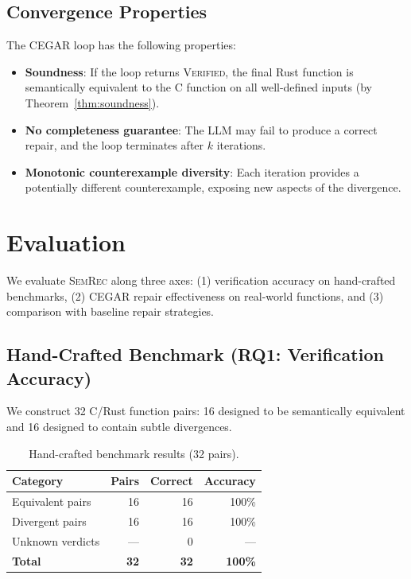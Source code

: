 \documentclass[10pt,letterpaper]{article}
\begin{document}
\subsection{Convergence Properties}

The CEGAR loop has the following properties:
\begin{itemize}[itemsep=1pt]
\item \textbf{Soundness}: If the loop returns \textsc{Verified}, the final
  Rust function is semantically equivalent to the C function on all well-defined
  inputs (by Theorem~\ref{thm:soundness}).
\item \textbf{No completeness guarantee}: The LLM may fail to produce a correct
  repair, and the loop terminates after $k$ iterations.
\item \textbf{Monotonic counterexample diversity}: Each iteration provides a
  potentially different counterexample, exposing new aspects of the divergence.
\end{itemize}

\section{Evaluation}
\label{sec:evaluation}

We evaluate \textsc{SemRec} along three axes: (1) verification accuracy on
hand-crafted benchmarks, (2) CEGAR repair effectiveness on real-world functions,
and (3) comparison with baseline repair strategies.

\subsection{Hand-Crafted Benchmark (RQ1: Verification Accuracy)}

We construct 32 C/Rust function pairs: 16 designed to be semantically equivalent
and 16 designed to contain subtle divergences.

\begin{table}[t]
\centering
\caption{Hand-crafted benchmark results (32 pairs).}
\label{tab:handcrafted}
\begin{tabular}{@{}lrrr@{}}
\toprule
\textbf{Category} & \textbf{Pairs} & \textbf{Correct} & \textbf{Accuracy} \\
\midrule
Equivalent pairs & 16 & 16 & 100\% \\
Divergent pairs & 16 & 16 & 100\% \\
Unknown verdicts & --- & 0 & --- \\
\midrule
\textbf{Total} & \textbf{32} & \textbf{32} & \textbf{100\%} \\
\bottomrule
\end{tabular}
\end{table}
\end{document}
